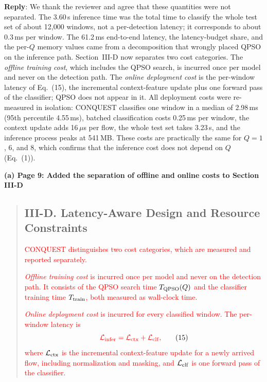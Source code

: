 \documentclass[11pt]{article}
\newenvironment{excerpt}{\begin{quote}\sloppy}{\end{quote}}
\newcommand{\reply}{\noindent\textbf{Reply}: }
\newcommand{\mshead}[2]{\subsection*{\textbf{#1. #2}}}
\newcommand{\loc}[1]{\par\medskip\noindent\textbf{#1}\par}
\begin{document}
\reply We thank the reviewer and agree that these quantities were not
separated. The 3.60\,s inference time was the total time to classify the
whole test set of about 12{,}000 windows, not a per-detection latency; it
corresponds to about 0.3\,ms per window. The 61.2\,ms end-to-end latency, the
latency-budget share, and the per-$Q$ memory values came from a decomposition
that wrongly placed QPSO on the inference path. Section~III-D now separates
two cost categories. The \textit{offline training cost}, which includes the
QPSO search, is incurred once per model and never on the detection path. The
\textit{online deployment cost} is the per-window latency of Eq.~(15), the
incremental context-feature update plus one forward pass of the classifier;
QPSO does not appear in it. All deployment costs were re-measured in
isolation: CONQUEST classifies one window in a median of 2.98\,ms (95th
percentile 4.55\,ms), batched classification costs 0.25\,ms per window, the
context update adds 16\,$\mu$s per flow, the whole test set takes 3.23\,s, and
the inference process peaks at 541\,MB. These costs are practically the same
for $Q=1$, 6, and 8, which confirms that the inference cost does not depend
on $Q$ (Eq.~(1)).

\loc{(a) Page 9: Added the separation of offline and online costs to Section III-D}
\begin{excerpt}
\mshead{III-D}{Latency-Aware Design and Resource Constraints}


\textcolor{red}{CONQUEST distinguishes two cost
categories, which are measured and reported separately.}

\textcolor{red}{\textit{Offline training cost} is incurred
once per model and never on the detection path. It consists of the
QPSO search time $T_{\rm QPSO}(Q)$ and the classifier training time
$T_{\rm train}$, both measured as wall-clock time.}

\textcolor{red}{\textit{Online deployment cost} is incurred
for every classified window. The per-window latency is}
\begin{equation}
\textcolor{red}{\mathcal{L}_{\rm infer} =
\mathcal{L}_{\rm ctx} + \mathcal{L}_{\rm clf},}
\tag{15}
\end{equation}
\textcolor{red}{where $\mathcal{L}_{\rm ctx}$ is the
incremental context-feature update for a newly arrived flow,
including normalization and masking, and $\mathcal{L}_{\rm clf}$ is
one forward pass of the classifier.}
\end{excerpt}
\end{document}
